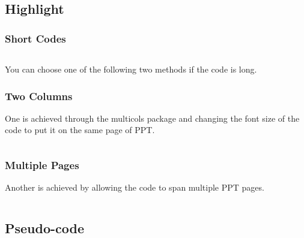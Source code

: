 \documentclass[
    10pt,
    pdf,
    UTF8,
    aspectratio=169
]{beamer}
\begin{document}
\subsection{Highlight}

\begin{frame}
    \frametitle{Short Codes}
    \inputminted[linenos]{cpp}{./code/demo.cpp}
    \hspace{2em} You can choose one of the following two methods if the code is long.
\end{frame}

\begin{frame}
    \frametitle{Two Columns}
    One is achieved through the multicols package and changing the font size of the code to put it on the same page of PPT.
    \begin{multicols}{2}
        \inputminted[linenos,fontsize=\scriptsize]{cpp}{./code/quicksort.cpp}
    \end{multicols}
\end{frame}

\begin{frame}[allowframebreaks]
    \frametitle{Multiple Pages}
    Another is achieved by allowing the code to span multiple PPT pages.
    \inputminted[linenos]{cpp}{./code/quicksort.cpp}
\end{frame}

\subsection{Pseudo-code}
\end{document}
